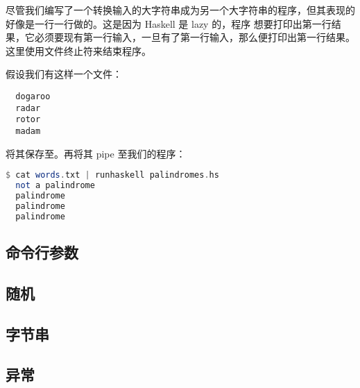 \documentclass[./main.tex]{subfiles}
\begin{document}
尽管我们编写了一个转换输入的大字符串成为另一个大字符串的程序，但其表现的好像是一行一行做的。这是因为 Haskell 是 lazy 的，程序
想要打印出第一行结果，它必须要现有第一行输入，一旦有了第一行输入，那么便打印出第一行结果。这里使用文件终止符来结束程序。

假设我们有这样一个文件：

\begin{lstlisting}
  dogaroo
  radar
  rotor
  madam
\end{lstlisting}

将其保存至。再将其 pipe 至我们的程序：

\begin{lstlisting}[language=Haskell]
  $ cat words.txt | runhaskell palindromes.hs
  not a palindrome
  palindrome
  palindrome
  palindrome
\end{lstlisting}






\subsection*{命令行参数}


\subsection*{随机}


\subsection*{字节串}


\subsection*{异常}

\end{document}
